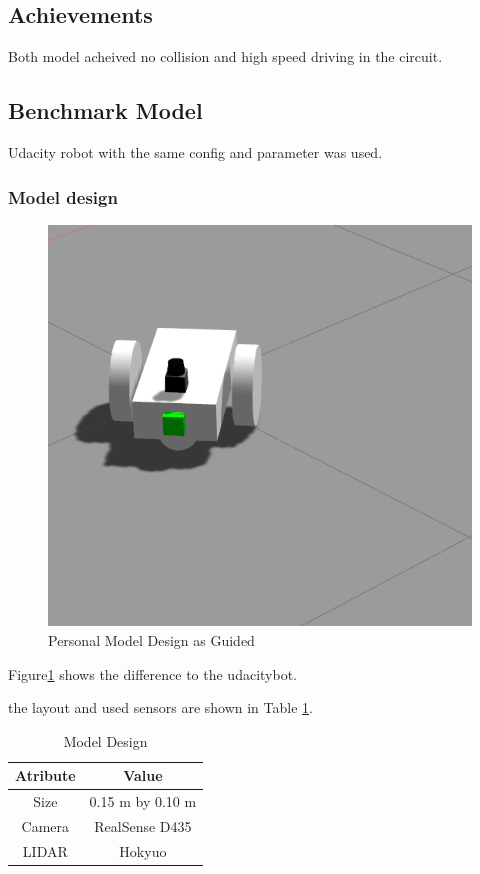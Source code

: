 \documentclass[10pt,journal,compsoc]{IEEEtran}
\begin{document}
\subsection{Achievements}
Both model acheived no collision and high speed driving in the circuit.

\subsection{Benchmark Model}
Udacity robot with the same config and parameter was used.
\subsubsection{Model design}
\begin{figure}[thpb]
      \centering
      \includegraphics[width=\linewidth]{./img/udacity_bot.png}
      \caption{Personal Model Design as Guided}
      \label{fig:Basic_Model}
\end{figure}
Figure\ref{fig:Basic_Model} shows the difference to the udacitybot.

the layout and used sensors are shown in Table \ref{table:model_design}.
\begin{table}[ht]
      \caption{Model Design}
      \label{table:model_design}
      \begin{center}
      \begin{tabular}{|c|c|}
      \hline
      Atribute & Value \\
      \hline\hline
      \hline
      Size & 0.15 m by 0.10 m \\
      \hline
      Camera & RealSense D435 \\
      \hline
      LIDAR & Hokyuo  \\
      \hline
      \end{tabular}
      \end{center}
\end{table}
\end{document}
